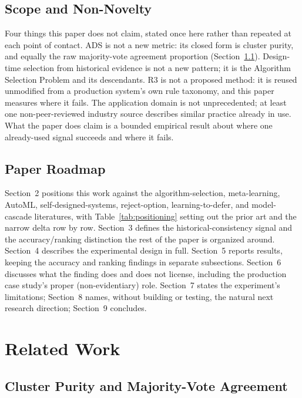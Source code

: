 \documentclass[11pt]{article}
\begin{document}
\subsection{Scope and Non-Novelty}
\label{sec:scope-non-novelty}

Four things this paper does not claim, stated once here rather than repeated
at each point of contact. ADS is not a new metric: its closed form is cluster
purity, and equally the raw majority-vote agreement proportion
(Section~\ref{sec:cluster-purity}). Design-time selection from historical
evidence is not a new pattern; it is the Algorithm Selection Problem
\citep{rice1976} and its descendants. R3 is not a proposed method: it is
reused unmodified from a production system's own rule taxonomy, and this
paper measures where it fails. The application domain is not unprecedented;
at least one non-peer-reviewed industry source \citep{kenfromfinance2025}
describes similar practice already in use. What the paper does claim is a
bounded empirical result about where one already-used signal succeeds and
where it fails.

\subsection{Paper Roadmap}
\label{sec:roadmap}

Section~2 positions this work against the algorithm-selection, meta-learning,
AutoML, self-designed-systems, reject-option, learning-to-defer, and model-
cascade literatures, with Table~\ref{tab:positioning} setting out the prior
art and the narrow delta row by row. Section~3 defines the
historical-consistency signal and
the accuracy/ranking distinction the rest of the paper is organized around.
Section~4 describes the experimental design in full. Section~5 reports
results, keeping the accuracy and ranking findings in separate subsections.
Section~6 discusses what the finding does and does not license, including the
production case study's proper (non-evidentiary) role. Section~7 states the
experiment's limitations; Section~8 names, without building or testing, the
natural next research direction; Section~9 concludes.

\section{Related Work}
\label{sec:related-work}

\subsection{Cluster Purity and Majority-Vote Agreement}
\label{sec:cluster-purity}
\end{document}
